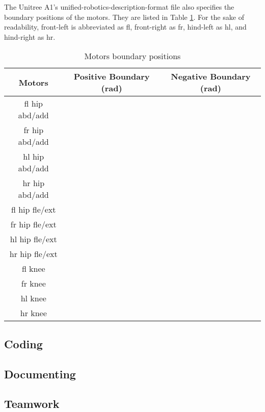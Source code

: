 The Unitree A1's unified-robotics-description-format file also specifies the boundary positions of the motors. They are listed in Table \ref{table:motors_boundary_positions}. For the sake of readability, front-left is abbreviated as fl, front-right as fr, hind-left as hl, and hind-right as hr.

\begin{table}[htbp]
   \centering
   \caption{Motors boundary positions}
   \begin{tabular}{|c|c|c|}
   \hline
   Motors & Positive Boundary (rad) & Negative Boundary (rad) \\ \hline
   fl hip abd/add & & \\ \hline
   fr hip abd/add & & \\ \hline
   hl hip abd/add & & \\ \hline
   hr hip abd/add & & \\ \hline
   fl hip fle/ext & & \\ \hline
   fr hip fle/ext & & \\ \hline
   hl hip fle/ext & & \\ \hline
   hr hip fle/ext & & \\ \hline
   fl knee        & & \\ \hline
   fr knee        & & \\ \hline
   hl knee        & & \\ \hline
   hr knee        & & \\ \hline
   \end{tabular}
   \label{table:motors_boundary_positions}
\end{table}



\subsection{Coding}



\subsection{Documenting}



\subsection{Teamwork}
